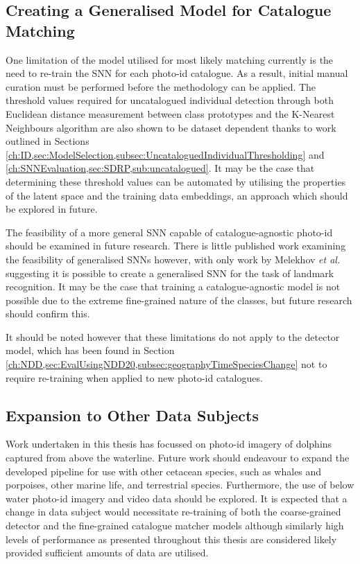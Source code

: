 \subsection{Creating a Generalised Model for Catalogue Matching}\label{ch:Conclusion,sec:FutureWork,sub:GeneralSNN}

One limitation of the model utilised for most likely matching currently is the need to re-train the SNN for each photo-id catalogue. As a result, initial manual curation must be performed before the methodology can be applied. The threshold values required for uncatalogued individual detection through both Euclidean distance measurement between class prototypes and the K-Nearest Neighbours algorithm are also shown to be dataset dependent thanks to work outlined in Sections \ref{ch:ID,sec:ModelSelection,subsec:UncataloguedIndividualThresholding} and \ref{ch:SNNEvaluation,sec:SDRP,sub:uncatalogued}. It may be the case that determining these threshold values can be automated by utilising the properties of the latent space and the training data embeddings, an approach which should be explored in future.

The feasibility of a more general SNN capable of catalogue-agnostic photo-id should be examined in future research. There is little published work examining the feasibility of generalised SNNs however, with only work by Melekhov \textit{et al.} \cite{melekhov_siamese_2016} suggesting it is possible to create a generalised SNN for the task of landmark recognition. It may be the case that training a catalogue-agnostic model is not possible due to the extreme fine-grained nature of the classes, but future research should confirm this. 

It should be noted however that these limitations do not apply to the detector model, which has been found in Section \ref{ch:NDD,sec:EvalUsingNDD20,subsec:geographyTimeSpeciesChange} not to require re-training when applied to new photo-id catalogues.

\subsection{Expansion to Other Data Subjects}\label{ch:Conclusion,sec:FutureWork,sub:Underwater,Video,OtherCetaceans}

Work undertaken in this thesis has focussed on photo-id imagery of dolphins captured from above the waterline. Future work should endeavour to expand the developed pipeline for use with other cetacean species, such as whales and porpoises, other marine life, and terrestrial species. Furthermore, the use of below water photo-id imagery \cite{van_bressem_visual_2018} and video data should be explored. It is expected that a change in data subject would necessitate re-training of both the coarse-grained detector and the fine-grained catalogue matcher models although similarly high levels of performance as presented throughout this thesis are considered likely provided sufficient amounts of data are utilised. 

